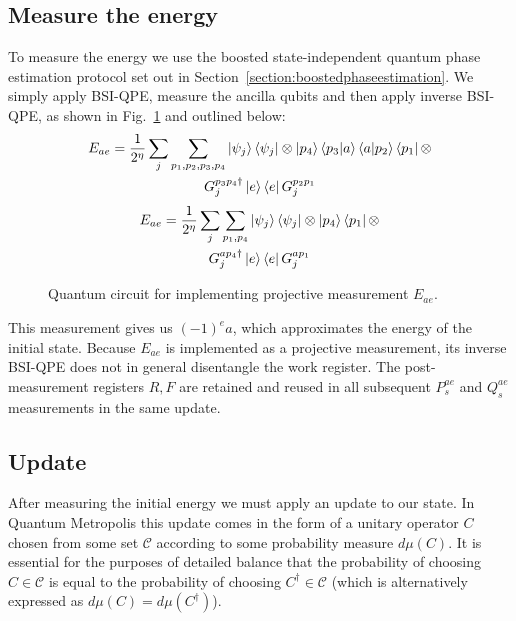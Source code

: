 \documentclass[aps,floatfix,10pt,amssymb,amsfont,amsmath,superscriptaddress,float,nofootinbib,longbibliography,nobalancelastpage,twocolumn]{revtex4-2}
\begin{document}
\subsection{Measure the energy}
\label{section:energymeasurement}
To measure the energy we use the boosted state-independent quantum phase estimation protocol set out in Section~\ref{section:boostedphaseestimation}. We simply apply BSI-QPE, measure the ancilla qubits and then apply inverse BSI-QPE, as shown in Fig.~\ref{fig:Ecircuit} and outlined below:
\begin{multline}
    E_{ae} = \frac{1}{2^{\eta}}\sum_j\sum_{p_1,p_2,p_3,p_4} \ket{\psi_j}\bra{\psi_j} \otimes \ket{p_4}\braket{p_3|a}\braket{a|p_2}\bra{p_1} \otimes \\G_j^{p_3p_4 \dagger}\ket{e}\bra{e}G_j^{p_2p_1}
\end{multline}
\begin{multline}
        E_{ae} = \frac{1}{2^{\eta}}\sum_j\sum_{p_1,p_4} \ket{\psi_j}\bra{\psi_j}\otimes\ket{p_4}\bra{p_1}\otimes\\
        G_j^{ap_4 \dagger}\ket{e}\bra{e}G_j^{ap_1}
\end{multline}
\begin{figure}

\caption{Quantum circuit for implementing projective measurement $E_{ae}$.}
\label{fig:Ecircuit}
\end{figure}
This measurement gives us $(-1)^ea$, which approximates the energy of the initial state. Because $E_{ae}$ is implemented as a projective measurement, its inverse BSI-QPE does not in general disentangle the work register. The post-measurement registers $R, F$ are retained and reused in all subsequent $P_s^{ae}$ and $Q_s^{ae}$ measurements in the same update.
\subsection{Update}
\label{section:update}
After measuring the initial energy we must apply an update to our state. In Quantum Metropolis this update comes in the form of a unitary operator $C$ chosen from some set $\mathcal{C}$ according to some probability measure $d\mu(C)$. It is essential for the purposes of detailed balance that the probability of choosing $C \in \mathcal{C}$ is equal to the probability of choosing $C^{\dagger} \in \mathcal{C}$ (which is alternatively expressed as $d\mu(C) = d\mu(C^{\dagger})$).
\end{document}
